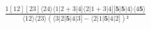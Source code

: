\documentclass[varwidth, border=5pt]{standalone}
\begin{document}
\begin{my}
$\begin{gathered}
\scriptscriptstyle\frac{1[12][23]⟨24⟩⟨1|2+3|4]⟨2|1+3|4][𝟓|𝟓|4⟩⟨4𝟓⟩}{⟨12⟩⟨23⟩(⟨3|2|𝟓|4|3]-⟨2|1|𝟓|4|2])²}
\end{gathered}$
\end{my}
\end{document}
